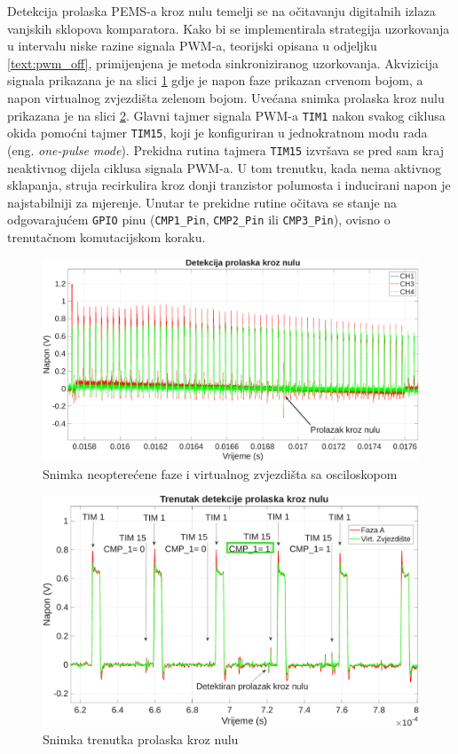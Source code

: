\documentclass[diplomskirad, upload]{fer}
\begin{document}
Detekcija prolaska PEMS-a kroz nulu temelji se na očitavanju digitalnih izlaza
vanjskih sklopova komparatora. Kako bi se implementirala strategija uzorkovanja
u intervalu niske razine signala PWM-a, teorijski opisana u odjeljku
\ref{text:pwm_off}, primijenjena je metoda sinkroniziranog uzorkovanja.
Akvizicija signala prikazana je na slici \ref{fig:zc} gdje je napon faze
prikazan crvenom bojom, a napon virtualnog zvjezdišta zelenom bojom. Uvećana
snimka prolaska kroz nulu prikazana je na slici \ref{fig:zc_zoom}. Glavni
tajmer signala PWM-a \texttt{TIM1} nakon svakog ciklusa okida pomoćni tajmer
\texttt{TIM15}, koji je konfiguriran u jednokratnom modu rada (eng.
\textit{one-pulse mode}). Prekidna rutina tajmera \texttt{TIM15} izvršava se
pred sam kraj neaktivnog dijela ciklusa signala PWM-a. U tom trenutku, kada
nema aktivnog sklapanja, struja recirkulira kroz donji tranzistor polumosta i
inducirani napon je najstabilniji za mjerenje. Unutar te prekidne rutine
očitava se stanje na odgovarajućem \texttt{GPIO} pinu (\texttt{CMP1\_Pin},
\texttt{CMP2\_Pin} ili \texttt{CMP3\_Pin}), ovisno o trenutačnom komutacijskom
koraku.

\begin{figure}[h!]
	\centering
	\includegraphics[width=\textwidth]{csv/zc.pdf}
	\caption{Snimka neopterećene faze i virtualnog zvjezdišta sa osciloskopom}
	\label{fig:zc}
\end{figure}

\begin{figure}[h!]
	\centering
	\includegraphics[width=\textwidth]{csv/zc_zoom.pdf}
	\caption{Snimka trenutka prolaska kroz nulu}
	\label{fig:zc_zoom}
\end{figure}
\end{document}
